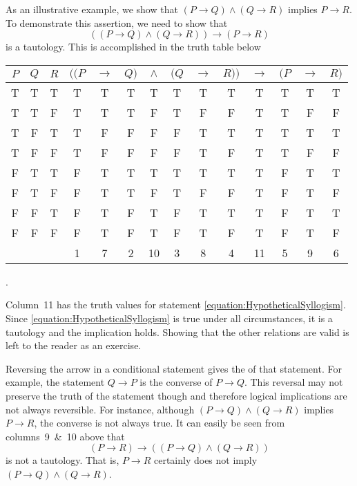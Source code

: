 As an illustrative example, we show that $(P \rightarrow Q) \wedge (Q \rightarrow R)$ implies $P \rightarrow R$.
To demonstrate this assertion, we need to show that
\begin{equation} \label{equation:HypotheticalSyllogism}
((P \rightarrow Q) \wedge (Q \rightarrow R)) \rightarrow (P \rightarrow R)
\end{equation}
is a tautology.
This is accomplished in the truth table below
\begin{center}
\begin{tabular}{|c|c|c|ccccccccccc|}
\hline
$P$ & $Q$ & $R$
& $((P$ & $\rightarrow$ & $Q)$ & $\wedge$ & $(Q$ & $\rightarrow$ & $R))$ & $\rightarrow$ & $(P$ & $\rightarrow$ & $R)$ \\
\hline
T & T & T & T & T & T & T & T & T & T & T & T & T & T \\
T & T & F & T & T & T & F & T & F & F & T & T & F & F \\
T & F & T & T & F & F & F & F & T & T & T & T & T & T \\
T & F & F & T & F & F & F & F & T & F & T & T & F & F \\
F & T & T & F & T & T & T & T & T & T & T & F & T & T \\
F & T & F & F & T & T & F & T & F & F & T & F & T & F \\
F & F & T & F & T & F & T & F & T & T & T & F & T & T \\
F & F & F & F & T & F & T & F & T & F & T & F & T & F \\
& & & 1 & 7 & 2 & 10 & 3 & 8 & 4 & 11 & 5 & 9 & 6 \\
\hline
\end{tabular} .
\end{center}
Column~11 has the truth values for statement \eqref{equation:HypotheticalSyllogism}.
Since \eqref{equation:HypotheticalSyllogism} is true under all circumstances, it is a tautology and the implication holds.
Showing that the other relations are valid is left to the reader as an exercise.

Reversing the arrow in a conditional statement gives the  of that statement.
For example, the statement $Q \rightarrow P$ is the converse of $P \rightarrow Q$.
This reversal may not preserve the truth of the statement though and therefore logical implications are not always reversible.
For instance, although $(P \rightarrow Q) \wedge (Q \rightarrow R)$ implies $P \rightarrow R$, the converse is not always true.
It can easily be seen from columns~9~\&~10 above that
\begin{equation*}
(P \rightarrow R) \rightarrow ((P \rightarrow Q) \wedge (Q \rightarrow R))
\end{equation*}
is not a tautology.
That is, $P \rightarrow R$ certainly does not imply $(P \rightarrow Q) \wedge (Q \rightarrow R)$.

